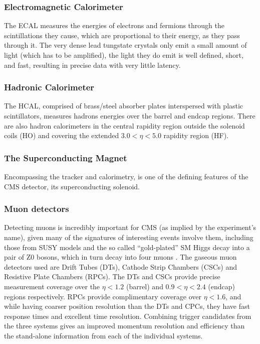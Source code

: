 \subsubsection{Electromagnetic Calorimeter}
The ECAL measures the energies of electrons and fermions through the scintillations they cause, which are proportional to their energy, as they pass through it.
The very dense lead tungstate crystals only emit a small amount of light (which has to be amplified), the light they do emit is well defined, short, and fast, resulting in precise data with very little latency\cite{oldcms}. 

\subsubsection{Hadronic Calorimeter}
The HCAL, comprised of brass/steel absorber plates interspersed with plastic scintillators, measures hadrons energies over the barrel and endcap regions. 
There are also hadron calorimeters in the central rapidity region outside the solenoid coils (HO) and covering the extended $3.0 < \eta < 5.0$ rapidity region (HF)\cite{Bayatian:2006zz}. 

\subsubsection{The Superconducting Magnet}
Encompassing the tracker and calorimetry, is one of the defining features of the CMS detector, its superconducting solenoid.
\subsubsection{Muon detectors}
Detecting muons is incredibly important for CMS (as implied by the experiment’s name), given many of the signatures of interesting events involve them, including those from SUSY models and the so called “gold-plated” SM Higgs decay into a pair of Z0 bosons, which in turn decay into four muons . 
The gaseous muon detectors used are Drift Tubes (DTs), Cathode Strip Chambers (CSCs) and Resistive Plate Chambers (RPCs). 
The DTs and CSCs provide precise measurement coverage over the $\eta < 1.2$ (barrel) and $0.9 < \eta < 2.4$ (endcap) regions respectively. 
RPCs provide complimentary coverage over $\eta < 1.6$, and while having coarser position resolution than the DTs and CPCs, they have fast response times and excellent time resolution. 
Combining trigger candidates from the three systems gives an improved momentum resolution and efficiency than the stand-alone information from each of the individual systems\cite{oldcms}. 

